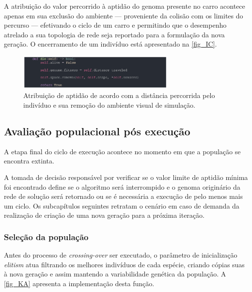 A atribuição do valor percorrido à aptidão do genoma presente no carro acontece apenas em sua exclusão do ambiente
— proveniente da colisão com os limites do percurso — efetivando o ciclo de um carro e permitindo que o desempenho atrelado a
sua topologia de rede seja reportado para a formulação da nova geração. O encerramento de um indivíduo está apresentado na \autoref{fig_IC}.

\begin{figure}[htb]
        \centering
        \caption{\label{fig_IC}Atribuição de aptidão de acordo com a distância percorrida pelo indivíduo e sua remoção do ambiente visual de simulação.}
        \includegraphics[width=0.7\textwidth]{images/IC.png}
\end{figure}

\subsection{Avaliação populacional pós execução}
A etapa final do ciclo de execução acontece no momento em que a população se encontra extinta.

A tomada de decisão responsável por verificar se o valor limite de aptidão mínima foi encontrado
define se o algoritmo será interrompido e o genoma originário da rede de solução será retornado
ou se é necessária a execução de pelo menos mais um ciclo. Os subcapítulos seguintes retratam o cenário
em caso de demanda da realização de criação de uma nova geração para a próxima iteração.

\subsubsection{Seleção da população}
Antes do processo de \textit{crossing-over} ser executado, o parâmetro de inicialização
\textit{elitism} atua filtrando os melhores indivíduos de cada espécie, criando cópias suas
à nova geração e assim mantendo a variabilidade genética da população. A \autoref{fig_KA} apresenta a implementação desta função.

